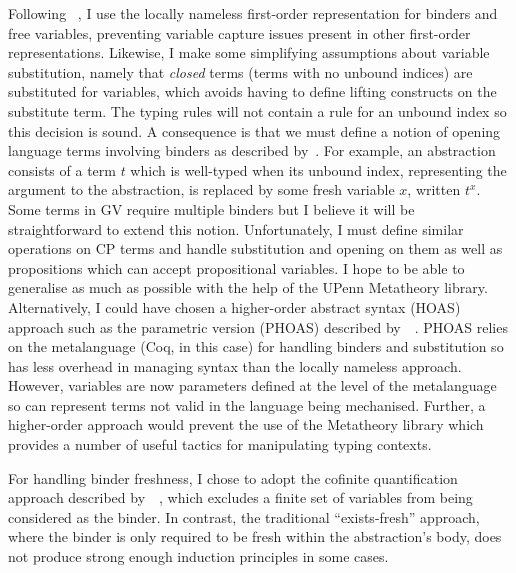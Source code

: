\documentclass{mprop}
\begin{document}
Following \citeauthor{Aydemir:2008:EFM}~\cite{Aydemir:2008:EFM}, I use the locally nameless first-order representation for binders and free variables, preventing variable capture issues present in other first-order representations. Likewise, I make some simplifying assumptions about variable substitution, namely that \textit{closed} terms (terms with no unbound indices) are substituted for variables, which avoids having to define lifting constructs on the substitute term. The typing rules will not contain a rule for an unbound index so this decision is sound. A consequence is that we must define a notion of opening language terms involving binders as described by~\citeauthor{Aydemir:2008:EFM}. For example, an abstraction consists of a term $t$ which is well-typed when its unbound index, representing the argument to the abstraction, is replaced by some fresh variable $x$, written $t^x$. Some terms in GV require multiple binders but I believe it will be straightforward to extend this notion. Unfortunately, I must define similar operations on CP terms and handle substitution and opening on them as well as propositions which can accept propositional variables. I hope to be able to generalise as much as possible with the help of the UPenn Metatheory library. Alternatively, I could have chosen a higher-order abstract syntax (HOAS) approach such as the parametric version (PHOAS) described by~\citeauthor{Chlipala:2008:PHOAS}~\cite{Chlipala:2008:PHOAS}. PHOAS relies on the metalanguage (Coq, in this case) for handling binders and substitution so has less overhead in managing syntax than the locally nameless approach. However, variables are now parameters defined at the level of the metalanguage so can represent terms not valid in the language being mechanised. Further, a higher-order approach would prevent the use of the Metatheory library which provides a number of useful tactics for manipulating typing contexts.

For handling binder freshness, I chose to adopt the cofinite quantification approach described by~\cite{Aydemir:2008:EFM}~\cite{Aydemir:2008:EFM}, which excludes a finite set of variables from being considered as the binder. In contrast, the traditional ``exists-fresh'' approach, where the binder is only required to be fresh within the abstraction's body, does not produce strong enough induction principles in some cases.
\end{document}
